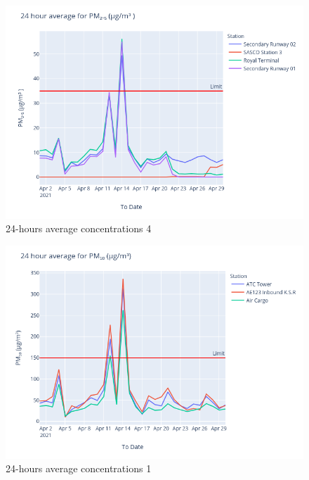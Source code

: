 \documentclass[12pt, oneside]{book}
\begin{document}
{
{\begin{figure}[H]
\centering
\includegraphics[width=\textwidth]{image222}
\caption{24-hours average  concentrations 4}\label{image222}
\end{figure}}{}

{\begin{figure}[H]
\centering
\includegraphics[width=\textwidth]{image187}
\caption{24-hours average  concentrations 1}\label{image187}
\end{figure}}{}


}
\end{document}
